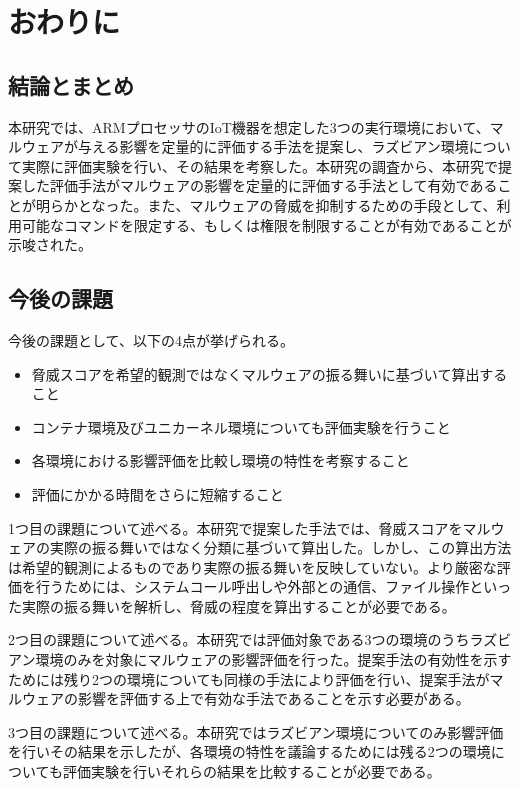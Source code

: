 \documentclass[12pt,a4paper,titlepage,report]{jsbook}
\begin{document}


\chapter{おわりに}
\section{結論とまとめ}
本研究では、ARMプロセッサのIoT機器を想定した3つの実行環境において、マルウェアが与える影響を定量的に評価する手法を提案し、ラズビアン環境について実際に評価実験を行い、その結果を考察した。本研究の調査から、本研究で提案した評価手法がマルウェアの影響を定量的に評価する手法として有効であることが明らかとなった。また、マルウェアの脅威を抑制するための手段として、利用可能なコマンドを限定する、もしくは権限を制限することが有効であることが示唆された。

\section{今後の課題}
今後の課題として、以下の4点が挙げられる。

\begin{itemize}
	\item 脅威スコアを希望的観測ではなくマルウェアの振る舞いに基づいて算出すること
	\item コンテナ環境及びユニカーネル環境についても評価実験を行うこと
	\item 各環境における影響評価を比較し環境の特性を考察すること
	\item 評価にかかる時間をさらに短縮すること
\end{itemize}

1つ目の課題について述べる。本研究で提案した手法では、脅威スコアをマルウェアの実際の振る舞いではなく分類に基づいて算出した。しかし、この算出方法は希望的観測によるものであり実際の振る舞いを反映していない。より厳密な評価を行うためには、システムコール呼出しや外部との通信、ファイル操作といった実際の振る舞いを解析し、脅威の程度を算出することが必要である。

2つ目の課題について述べる。本研究では評価対象である3つの環境のうちラズビアン環境のみを対象にマルウェアの影響評価を行った。提案手法の有効性を示すためには残り2つの環境についても同様の手法により評価を行い、提案手法がマルウェアの影響を評価する上で有効な手法であることを示す必要がある。

3つ目の課題について述べる。本研究ではラズビアン環境についてのみ影響評価を行いその結果を示したが、各環境の特性を議論するためには残る2つの環境についても評価実験を行いそれらの結果を比較することが必要である。
\end{document}
